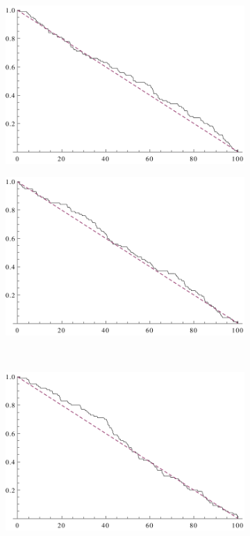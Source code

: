 \begin{figure}[ht!]
    \centering
    \begin{subfigure}[b]{0.45\textwidth}
        \centering
        \includegraphics[scale=0.5]{continuum/figures/loc_uniform_dist/1}
    \end{subfigure}
    \begin{subfigure}[b]{0.45\textwidth}
        \centering
        \includegraphics[scale=0.5]{continuum/figures/loc_uniform_dist/2}
    \end{subfigure}
    \\
    \begin{subfigure}[b]{0.45\textwidth}
        \centering
        \includegraphics[scale=0.5]{continuum/figures/loc_uniform_dist/3}

\end{subfigure}
\end{figure}
